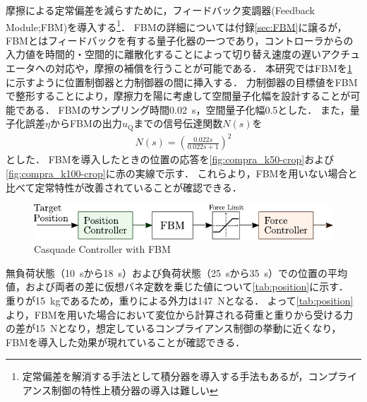 摩擦による定常偏差を減らすために，フィードバック変調器(Feedback Module;FBM)を導入する\footnote{定常偏差を解消する手法として積分器を導入する手法もあるが，コンプライアンス制御の特性上積分器の導入は難しい}\cite{石川将人2007,石川将人2008フィードバック変調器を用いた離散値入力制御におけるアクチュエータ非線形性の補償}．
FBMの詳細については付録\ref{sec:FBM}に譲るが，FBMとはフィードバックを有する量子化器の一つであり，コントローラからの入力値を時間的・空間的に離散化することによって切り替え速度の遅いアクチュエータへの対応や，摩擦の補償を行うことが可能である\cite{石川将人2008フィードバック変調器を用いた離散値入力制御におけるアクチュエータ非線形性の補償,佐藤順紀2013不等間隔量子化入力とアクチュエータの非線形要素モデルを用いたフィードバック変調器による油圧駆動システムの軌道制御,Ohgi_2008jrm}．
本研究ではFBMを\figname\ref{fig:casquade_torqueandposition_FBM}に示すように位置制御器と力制御器の間に挿入する．
力制御器の目標値をFBMで整形することにより，摩擦力を陽に考慮して空間量子化幅を設計することが可能である．
FBMのサンプリング時間\SI{0.02}{s}，空間量子化幅0.5とした．
また，量子化誤差$\eta$からFBMの出力$u_\mathrm{Q}$までの信号伝達関数$N(s)$を
\begin{align}
    \label{eq:Ns}
    N(s) = \left( \frac{0.022s}{0.022s+1} \right)^2
\end{align}
とした．
FBMを導入したときの位置の応答を\figname\ref{fig:compra_k50-crop}および\figname\ref{fig:compra_k100-crop}に赤の実線で示す．
これらより，FBMを用いない場合と比べて定常特性が改善されていることが確認できる．
\begin{figure}[t]
    \centering
        \includegraphics[keepaspectratio, scale=1.0]{contents/IntegrationControl/figure/casquade_torqueandposition_FBM.pdf}
        \caption{Casquade Controller with FBM}
        \label{fig:casquade_torqueandposition_FBM}
\end{figure}

無負荷状態（\SI{10}{s}から\SI{18}{s}）および負荷状態（\SI{25}{s}から\SI{35}{s}）での位置の平均値，および両者の差に仮想バネ定数を乗じた値について\tabname\ref{tab:position}に示す．
重りが\SI{15}{kg}であるため，重りによる外力は\SI{147}{N}となる．
よって\tabname\ref{tab:position}より，FBMを用いた場合において変位から計算される荷重と重りから受ける力の差が\SI{15}{N}となり，想定しているコンプライアンス制御の挙動に近くなり，FBMを導入した効果が現れていることが確認できる．

